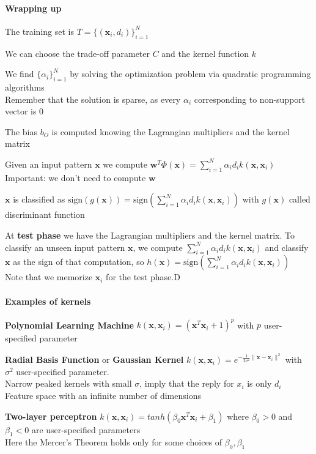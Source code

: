 \documentclass[10pt]{report}
\begin{document}
\paragraph{Wrapping up}
\begin{list}{}{}
	\item The training set is $T = \{(\mathbf{x}_i,d_i)\}_{i=1}^N$
	\item We can choose the trade-off parameter $C$ and the kernel function $k$
	\item We find $\{\alpha_i\}_{i=1}^N$ by solving the optimization problem via quadratic programming algorithms\\
	Remember that the solution is sparse, as every $\alpha_i$ corresponding to non-support vector is $0$
	\item The bias $b_O$ is computed knowing the Lagrangian multipliers and the kernel matrix
	\item Given an input pattern $\mathbf{x}$ we compute $\mathbf{w}^T\Phi(\mathbf{x}) = \sum_{i=1}^N\alpha_id_ik(\mathbf{x},\mathbf{x}_i)$\\
	Important: we don't need to compute $\mathbf{w}$
	\item $\mathbf{x}$ is classified as $\text{sign}(g(\mathbf{x})) = \text{sign}\left(\sum_{i=1}^N\alpha_id_ik(\mathbf{x},\mathbf{x}_i)\right)$ with $g(\mathbf{x})$ called discriminant function
\end{list}
At \textbf{test phase} we have the Lagrangian multipliers and the kernel matrix. To classify an unseen input pattern $\mathbf{x}$, we compute $\sum_{i=1}^N\alpha_id_ik(\mathbf{x},\mathbf{x}_i)$ and classify $\mathbf{x}$ as the sign of that computation, so $h(\mathbf{x}) = \text{sign}\left(\sum_{i=1}^N\alpha_id_ik(\mathbf{x},\mathbf{x}_i)\right)$\\
Note that we memorize $\mathbf{x}_i$ for the test phase.D
\paragraph{Examples of kernels}
\begin{list}{}{}
	\item \textbf{Polynomial Learning Machine} $k(\mathbf{x},\mathbf{x}_i) = (\mathbf{x}^T\mathbf{x}_i + 1)^p$ with $p$ user-specified parameter
	\item \textbf{Radial Basis Function} or \textbf{Gaussian Kernel} $k(\mathbf{x},\mathbf{x}_i) = e^{-\frac{1}{2\sigma^2}\|\mathbf{x}-\mathbf{x}_i\|^2}$ with $\sigma^2$ user-specified parameter.\\
	Narrow peaked kernels with small $\sigma$, imply that the reply for $x_i$ is only $d_i$\\
	Feature space with an infinite number of dimensions
	\item \textbf{Two-layer perceptron} $k(\mathbf{x},\mathbf{x}_i) = tanh(\beta_0\mathbf{x}^T\mathbf{x}_i + \beta_1)$ where $\beta_0 > 0$ and $\beta_1 < 0$ are user-specified parameters\\
	Here the Mercer's Theorem holds only for some choices of $\beta_0,\beta_1$
\end{list}
\end{document}
